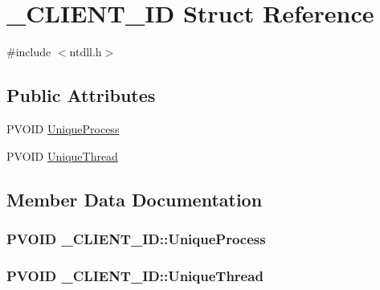 \section{\-\_\-\-C\-L\-I\-E\-N\-T\-\_\-\-I\-D Struct Reference}
\label{struct___c_l_i_e_n_t___i_d}


{\ttfamily \#include $<$ntdll.\-h$>$}

\subsection*{Public Attributes}
\begin{DoxyCompactItemize}
\item 
P\-V\-O\-I\-D \hyperlink{struct___c_l_i_e_n_t___i_d_a462daaa4c961625ed688c8da0841a652}{Unique\-Process}
\item 
P\-V\-O\-I\-D \hyperlink{struct___c_l_i_e_n_t___i_d_aecbe286eb2370ae59a3e5459f251d686}{Unique\-Thread}
\end{DoxyCompactItemize}


\subsection{Member Data Documentation}
\subsubsection[{Unique\-Process}]{\setlength{\rightskip}{0pt plus 5cm}P\-V\-O\-I\-D \-\_\-\-C\-L\-I\-E\-N\-T\-\_\-\-I\-D\-::\-Unique\-Process}\label{struct___c_l_i_e_n_t___i_d_a462daaa4c961625ed688c8da0841a652}
\subsubsection[{Unique\-Thread}]{\setlength{\rightskip}{0pt plus 5cm}P\-V\-O\-I\-D \-\_\-\-C\-L\-I\-E\-N\-T\-\_\-\-I\-D\-::\-Unique\-Thread}\label{struct___c_l_i_e_n_t___i_d_aecbe286eb2370ae59a3e5459f251d686}
